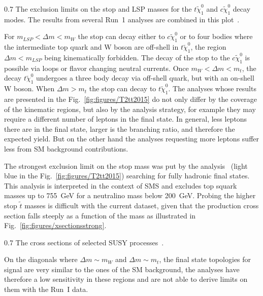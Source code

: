                  {0.7}       %
                { The exclusion limits on the stop and LSP masses for the $t \tilde{\chi}_{1}^0$ and $c \tilde{\chi}_{1}^0$ decay modes. The results from several Run~1 analyses are combined in this plot~\cite{website:SUSYresRunI}.   } %

For $m_{LSP} < \Delta m < m_{W}$ the stop can decay either to $c \tilde{\chi}_{1}^0$ or to four bodies where the intermediate top quark and W boson are off-shell in $t \tilde{\chi}_{1}^0$, the region $\Delta m < m_{LSP}$ being kinematically forbidden. The decay of the stop to the $c \tilde{\chi}_{1}^0$ is possible via loops or flavor changing neutral currents. Once $m_{W} < \Delta m < m_{t}$, the decay $t \tilde{\chi}_{1}^0$ undergoes a three body decay via off-shell quark, but with an on-shell W boson. When $\Delta m > m_{t}$ the stop can decay to $t \tilde{\chi}_{1}^0$. The analyses whose results are presented in the Fig.~\ref{fig:figures/T2tt2015} do not only differ by the coverage of the kinematic regions, but also by the analysis strategy, for example they may require a different number of leptons in the final state. In general, less leptons there are in the final state, larger is the branching ratio, and therefore the expected yield. But on the other hand the analyses requesting more leptons suffer less from SM background contributions.  

The strongest exclusion limit on the stop mass was put by the analysis~\cite{Khachatryan:2016oia} (light blue in the Fig.~\ref{fig:figures/T2tt2015}) searching for fully hadronic final states. This analysis is interpreted in the context of SMS and excludes top squark masses up to 755~GeV for a neutralino mass  below 200~GeV. Probing the higher stop $\tilde{t}$ masses is difficult with the current dataset, given that the production cross section falls steeply as a function of the mass as illustrated in Fig.~\ref{fig:figures/xsectionsstrong}.
 
                 {0.7}       %
                 { The cross sections of selected SUSY processes~\cite{website:LHCxsec}. }


On the diagonals where $\Delta m \sim m_{W}$ and $\Delta m \sim m_{t}$, the final state topologies for signal are very similar to the ones of the SM background, the analyses have therefore a low sensitivity in these regions and are not able to derive limits on them with the Run~I data.

